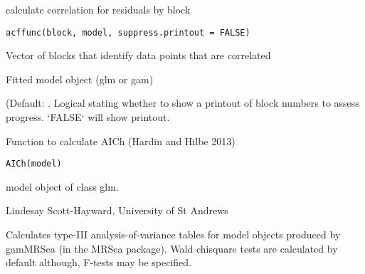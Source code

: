 \documentclass[a4paper]{book}
\begin{document}
%
\begin{Description}\relax
calculate correlation for residuals by block
\end{Description}
%
\begin{Usage}
\begin{verbatim}
acffunc(block, model, suppress.printout = FALSE)
\end{verbatim}
\end{Usage}
%
\begin{Arguments}
\begin{ldescription}
\item[\code{block}] Vector of blocks that identify data points that are correlated

\item[\code{model}] Fitted model object (glm or gam)

\item[\code{suppress.printout}] (Default: . Logical stating whether to show a printout of block numbers to assess progress. `FALSE` will show printout.
\end{ldescription}
\end{Arguments}
%
\begin{Description}\relax
Function to calculate AICh (Hardin and Hilbe 2013)
\end{Description}
%
\begin{Usage}
\begin{verbatim}
AICh(model)
\end{verbatim}
\end{Usage}
%
\begin{Arguments}
\begin{ldescription}
\item[\code{model}] model object of class glm.
\end{ldescription}
\end{Arguments}
%
\begin{Author}\relax
Lindesay Scott-Hayward, University of St Andrews
\end{Author}
%
\begin{Description}\relax
Calculates type-III analysis-of-variance tables for model objects produced by gamMRSea (in the MRSea package). Wald chisquare tests are calculated by default although, F-tests may be specified.
\end{Description}
\end{document}
